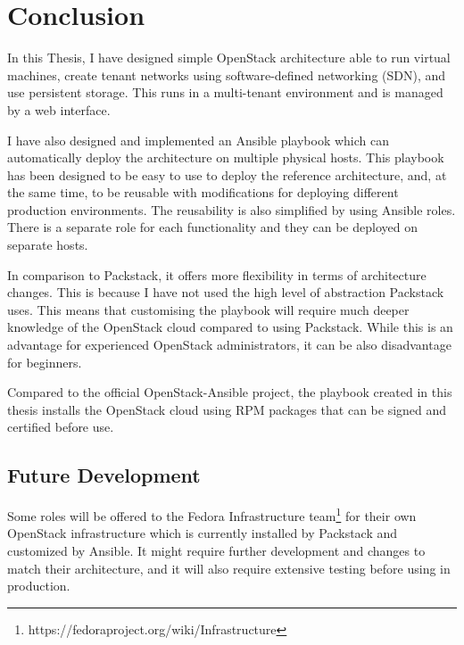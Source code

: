 \chapter{Conclusion}
\label{ch:conclusion}
In this Thesis, I have designed simple OpenStack architecture able to run virtual machines, create tenant networks using software-defined networking (SDN), and use persistent storage. This runs in a multi-tenant environment and is managed by a web interface.

I have also designed and implemented an Ansible playbook which can automatically deploy the architecture on multiple physical hosts. This playbook has been designed to be easy to use to deploy the reference architecture, and, at the same time, to be reusable with modifications for deploying different production environments. The reusability is also simplified by using Ansible roles. There is a separate role for each functionality and they can be deployed on separate hosts.

In comparison to Packstack, it offers more flexibility in terms of architecture changes. This is because I have not used the high level of abstraction Packstack uses. This means that customising the playbook will require much deeper knowledge of the OpenStack cloud compared to using Packstack. While this is an advantage for experienced OpenStack administrators, it can be also disadvantage for beginners.

Compared to the official OpenStack-Ansible project, the playbook created in this thesis installs the OpenStack cloud using RPM packages that can be signed and certified before use.

\section{Future Development}

Some roles will be offered to the Fedora Infrastructure team\footnote{https://fedoraproject.org/wiki/Infrastructure} for their own OpenStack infrastructure which is currently installed by Packstack and customized by Ansible. It might require further development and changes to match their architecture, and it will also require extensive testing before using in production.
